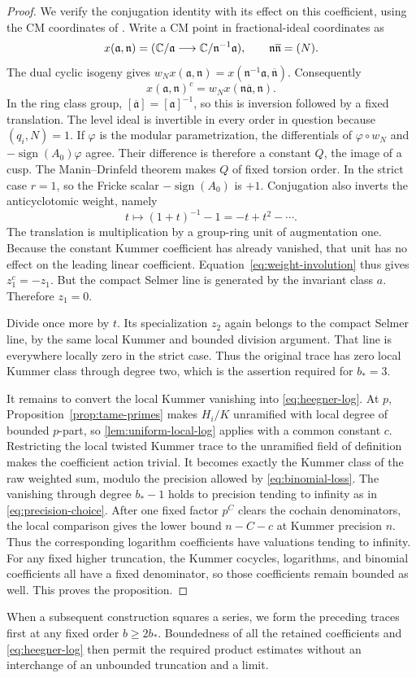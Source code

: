 \begin{proof}
We verify the conjugation identity with its effect on this
coefficient, using the CM coordinates of
\cite[Chapter~II, Section~1]{GrossZagier1986}.  Write a CM point
in fractional-ideal coordinates as
\[
 x(\mathfrak a,\mathfrak n)=
  (\mathbb C/\mathfrak a\longrightarrow\mathbb C/\mathfrak n^{-1}\mathfrak a),
 \qquad \mathfrak n\overline{\mathfrak n}=(N).
\]
The dual cyclic isogeny gives
$w_Nx(\mathfrak a,\mathfrak n)
 =x(\mathfrak n^{-1}\mathfrak a,\overline{\mathfrak n})$.
Consequently
\[
 x(\mathfrak a,\mathfrak n)^c
   =w_Nx(\mathfrak n\overline{\mathfrak a},\mathfrak n).
\]
In the ring class group,
$[\overline{\mathfrak a}]=[\mathfrak a]^{-1}$, so this is inversion
followed by a fixed translation.  The level ideal is invertible
in every order in question because $(q_i,N)=1$.  If $\varphi$ is
the modular parametrization, the differentials of
$\varphi\circ w_N$ and
$-\operatorname{sign}(A_0)\varphi$ agree.  Their difference is
therefore a constant $Q$, the image of a cusp.  The Manin--Drinfeld
theorem \cite{Manin1972,Drinfeld1973} makes
$Q$ of fixed torsion order.  In the strict case $r=1$, so the
Fricke scalar $-\operatorname{sign}(A_0)$ is $+1$.
Conjugation also inverts the anticyclotomic weight, namely
\begin{equation}\label{eq:weight-involution}
 t\longmapsto(1+t)^{-1}-1=-t+t^2-\cdots.
\end{equation}
The translation is multiplication by a group-ring unit of
augmentation one.  Because the constant Kummer coefficient has
already vanished, that unit has no effect on the leading linear
coefficient.  Equation~\eqref{eq:weight-involution} thus gives
$z_1^c=-z_1$.  But the compact Selmer line is generated by the
invariant class $a$.  Therefore $z_1=0$.

Divide once more by $t$.  Its specialization $z_2$ again belongs
to the compact Selmer line, by the same local Kummer and bounded
division argument.  That line is everywhere locally zero in
the strict case.  Thus the original trace has zero local Kummer
class through degree two, which is the assertion required for
$b_*=3$.

It remains to convert the local Kummer vanishing into
\cref{eq:heegner-log}.  At $p$,
Proposition~\ref{prop:tame-primes} makes $H_i/K$ unramified with
local degree of bounded $p$-part, so
\cref{lem:uniform-local-log} applies with a common constant $c$.
Restricting the local twisted Kummer trace to the unramified field
of definition makes the coefficient action trivial.  It becomes
exactly the Kummer class of the raw weighted sum, modulo the
precision allowed by \cref{eq:binomial-loss}.  The vanishing
through degree $b_*-1$ holds to precision tending to infinity as
in \cref{eq:precision-choice}.  After one fixed factor $p^C$
clears the cochain denominators, the local comparison gives the
lower bound $n-C-c$ at Kummer precision $n$.  Thus the
corresponding logarithm coefficients have valuations tending to
infinity.  For any fixed higher truncation, the Kummer cocycles,
logarithms, and binomial coefficients all have a fixed denominator,
so those coefficients
remain bounded as well.  This proves the proposition.
\end{proof}

When a subsequent construction squares a series, we form the
preceding traces first at any fixed order $b\ge2b_*$.  Boundedness
of all the retained coefficients and
\cref{eq:heegner-log} then permit the required product estimates
without an interchange of an unbounded truncation and a limit.
